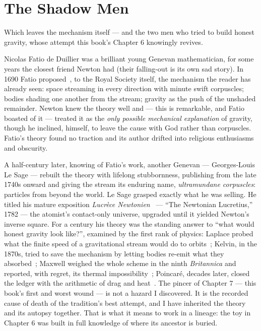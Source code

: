 \documentclass[fontsize=11pt,paper=a4,pagesize=auto,parskip=half-]{scrbook}
\newcommand{\Iy}[1]{#1\index{#1}}
\begin{document}
\section{The Shadow Men}

Which leaves the mechanism itself --- and the two men who tried to build honest gravity, whose attempt this book's Chapter 6 knowingly revives.

Nicolas \Iy{Fatio} de Duillier was a brilliant young Genevan mathematician, for some years the closest friend Newton had (their falling-out is its own sad story). In 1690 Fatio proposed~\cite{fatio1690}, to the Royal Society itself, the mechanism the reader has already seen: space streaming in every direction with minute swift corpuscles; bodies shading one another from the stream; gravity as the push of the unshaded remainder. Newton knew the theory well and --- this is remarkable, and Fatio boasted of it --- treated it as the \emph{only possible mechanical explanation} of gravity, though he inclined, himself, to leave the cause with God rather than corpuscles. Fatio's theory found no traction and its author drifted into religious enthusiasms and obscurity.

A half-century later, knowing of Fatio's work, another Genevan --- Georges-Louis \Iy{Le Sage} --- rebuilt the theory with lifelong stubbornness, publishing from the late 1740s onward and giving the stream its enduring name, \emph{ultramundane corpuscles}: particles from beyond the world. Le Sage grasped exactly what he was selling. He titled his mature exposition \emph{Lucrèce Newtonien}~\cite{lesage1782,edwards2002} --- ``The Newtonian Lucretius,'' 1782 --- the atomist's contact-only universe, upgraded until it yielded Newton's inverse square. For a century his theory was the standing answer to ``what would honest gravity look like?'', examined by the first rank of physics: Laplace probed what the finite speed of a gravitational stream would do to orbits~\cite{laplace1805}; \Iy{Kelvin}, in the 1870s, tried to save the mechanism by letting bodies re-emit what they absorbed~\cite{kelvin1873}; \Iy{Maxwell} weighed the whole scheme in the ninth \emph{Britannica} and reported, with regret, its thermal impossibility~\cite{maxwell1875}; Poincaré, decades later, closed the ledger with the arithmetic of drag and heat~\cite{poincare1908}. The pincer of Chapter 7 --- this book's first and worst wound --- is not a hazard I discovered. It is the recorded cause of death of the tradition's best attempt, and I have inherited the theory and its autopsy together. That is what it means to work in a lineage: the toy in Chapter 6 was built in full knowledge of where its ancestor is buried.
\end{document}
